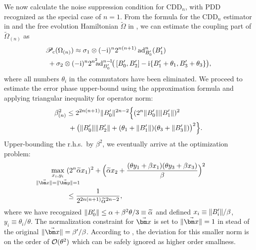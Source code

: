 \documentclass[aps,pra,reprint,superscriptaddress]{revtex4-2}
\newcommand{\alphat}{\widetilde{\alpha}}
\newcommand{\Omegat}{\widetilde{\Omega}}
\newcommand{\Pcp}{\mathscr{P}_{\mathrm{c}}}
\begin{document}
We now calculate the noise suppression condition for $\mathrm{CDD}_n$, with PDD recognized as the special case of $n=1$. From the formula for the $\mathrm{CDD}_n$ estimator in  and the
 free evolution Hamiltonian $\Omegat$ in , we can estimate the coupling part of $\Omegat_{(n)}$ as 
\begin{align}
&\Pcp(\Omega_{(n)})
\approx \sigma_1 \otimes (-\upi)^{n} 2^{n(n+1)} \ad_{B'_0}^{n}(B'_1)\\ 
&\ + \sigma_2 \otimes (-\upi)^{n} 2^{n^2}\!\!\!\ad_{B'_0}^{n-\!1}\!\bigl(\,[B'_0,B'_2] - \upi \{B'_1+\theta_1,B_3'+\theta_3\}\bigr),\notag
\end{align} 
where all numbers $\theta_i$ in the commutators have been eliminated. We proceed to estimate the error phase upper-bound using the approximation formula  and applying triangular inequality for operator norm:
\begin{equation}
\begin{aligned}
&\beta^2_{(n)} 
\le 2^{2n(n+1)} \Vert {B_0'} \Vert^{2n-2} \Bigl\{ (2^n  \Vert {B_0'} \Vert \Vert {B_1'} \Vert)^2  \\
&\qquad + \bigl(\Vert {B_0'} \Vert \Vert {B_2'} \Vert +(\theta_1+\Vert {B_1'} \Vert)(\theta_3+\Vert { B_3'} \Vert) \bigr)^2 \Bigr\}.
\end{aligned}
\end{equation}
Upper-bounding the r.h.s.\ by $\beta^2$, we eventually arrive at the optimization problem:
\begin{align}\label{eq:ncdd-opt}
\mathop{\max_{x_i, y_i}}_{\mathclap{\norm{\vb x}=\norm{\vb y}=1}} \ 
& (2^n\alphat x_1)^2 + \Bigl(\alphat x_2 + 
\frac{(\theta y_1+\beta x_1)(\theta y_3+ \beta x_3)}{\beta}\Bigr)^2\notag\\
 &  \le \frac{1}{2^{2n(n+1)}\alphat^{2n-2}},
\end{align}
where we have recognized $\norm{B_0'}\le \alpha + \beta^2 \theta/3 \equiv \alphat$ and defined $x_i\equiv\Vert {B_i'} \Vert/\beta$, $y_i\equiv\theta_i/\theta$.
The normalization constraint for $\vb x$ is set to $\norm{\vb x} = 1$ in stead of the original $\norm{\vb x} = \beta'/\beta$. According to , the deviation for this smaller norm is on the order of $\mathcal{O}(\theta^2)$ which can be safely ignored as higher order smallness.
\end{document}
